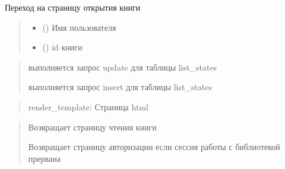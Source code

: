 \documentclass[letterpaper,10pt,russian]{sphinxmanual}
\begin{document}
\begin{fulllineitems}
\label{\detokenize{blueprints:blueprints.book_read.open_book}}
\pysigstartsignatures
{}
\pysigstopsignatures
\sphinxAtStartPar
Переход на страницу открытия книги
\begin{quote}\begin{description}
\begin{itemize}
\item {} 
\sphinxAtStartPar
{} () \textendash{} Имя пользователя

\item {} 
\sphinxAtStartPar
{} () \textendash{} id книги

\end{itemize}

\end{description}\end{quote}
\begin{description}
\begin{quote}\begin{description}
\sphinxAtStartPar
выполняется запрос update для таблицы list\_states

\sphinxAtStartPar
выполняется запрос insert для таблицы list\_states

\end{description}\end{quote}

\end{description}
\begin{quote}\begin{description}
\sphinxAtStartPar
render\_template: Страница html

\end{description}\end{quote}
\begin{description}
\begin{quote}\begin{description}
\sphinxAtStartPar
Возвращает страницу чтения книги

\sphinxAtStartPar
Возвращает страницу авторизации если сессия работы с библиотекой прервана

\end{description}\end{quote}

\end{description}

\end{fulllineitems}
\end{document}
